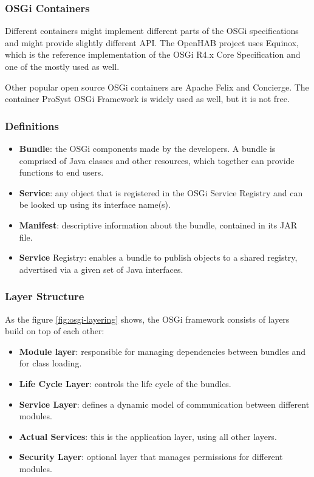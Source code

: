\subsubsection{OSGi Containers}
Different containers might implement different parts of the OSGi specifications and might provide slightly different API. The OpenHAB 
project uses Equinox, which is the reference implementation of the OSGi R4.x Core Specification and one of the mostly used as well.

Other popular open source OSGi containers are Apache Felix and Concierge. The container ProSyst OSGi Framework is widely used as 
well, but it is not free.

\subsubsection{Definitions}
\begin{itemize}
	\item \textbf{Bundle}: the OSGi components made by the developers. A bundle is comprised of Java classes and other resources, 
	which together can provide functions to end users.
	\item \textbf{Service}: any object that is registered in the OSGi Service Registry and can be looked up using its interface name(s).
	\item \textbf{Manifest}: descriptive information about the bundle, contained in its JAR file.
	\item \textbf{Service} Registry: enables a bundle to publish objects to a shared registry, advertised via a given set of Java interfaces.
\end{itemize}

\subsubsection{Layer Structure}
As the figure \ref{fig:osgi-layering} shows, the OSGi framework consists of layers build on top of each other:

\begin{itemize}
	\item \textbf{Module layer}: responsible for managing dependencies between bundles and for class loading.
	\item \textbf{Life Cycle Layer}: controls the life cycle of the bundles.
	\item \textbf{Service Layer}: defines a dynamic model of communication between different modules.
	\item \textbf{Actual Services}: this is the application layer, using all other layers.
	\item \textbf{Security Layer}: optional layer that manages permissions for different modules.
\end{itemize}

